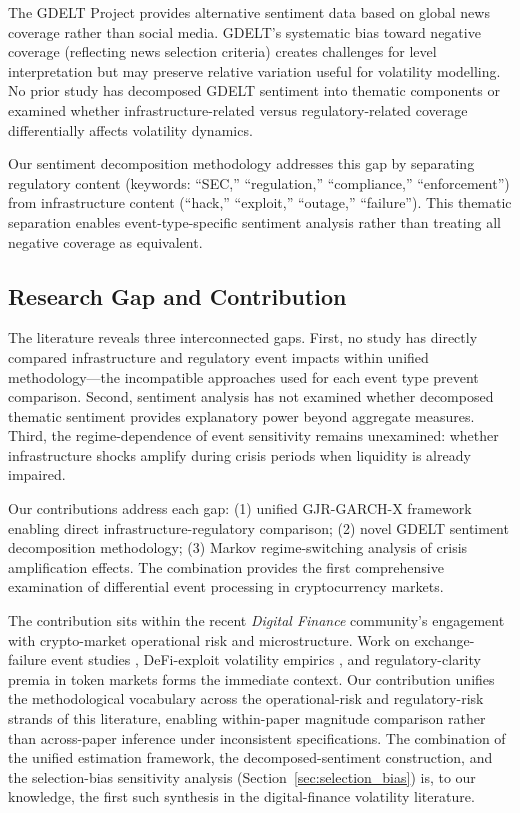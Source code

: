 \documentclass[pdflatex,sn-mathphys-num]{sn-jnl}
\theoremstyle{thmstyleone}
\theoremstyle{thmstyletwo}
\theoremstyle{thmstylethree}
\begin{document}
The GDELT Project provides alternative sentiment data based on global news coverage rather than social media. GDELT's systematic bias toward negative coverage (reflecting news selection criteria) creates challenges for level interpretation but may preserve relative variation useful for volatility modelling. No prior study has decomposed GDELT sentiment into thematic components or examined whether infrastructure-related versus regulatory-related coverage differentially affects volatility dynamics.

Our sentiment decomposition methodology addresses this gap by separating regulatory content (keywords: ``SEC,'' ``regulation,'' ``compliance,'' ``enforcement'') from infrastructure content (``hack,'' ``exploit,'' ``outage,'' ``failure''). This thematic separation enables event-type-specific sentiment analysis rather than treating all negative coverage as equivalent.

\subsection{Research Gap and Contribution}

The literature reveals three interconnected gaps. First, no study has directly compared infrastructure and regulatory event impacts within unified methodology---the incompatible approaches used for each event type prevent comparison. Second, sentiment analysis has not examined whether decomposed thematic sentiment provides explanatory power beyond aggregate measures. Third, the regime-dependence of event sensitivity remains unexamined: whether infrastructure shocks amplify during crisis periods when liquidity is already impaired.

Our contributions address each gap: (1) unified GJR-GARCH-X framework enabling direct infrastructure-regulatory comparison; (2) novel GDELT sentiment decomposition methodology; (3) Markov regime-switching analysis of crisis amplification effects. The combination provides the first comprehensive examination of differential event processing in cryptocurrency markets.

The contribution sits within the recent \textit{Digital Finance} community's engagement with crypto-market operational risk and microstructure. Work on exchange-failure event studies \citep{ChenEtAl2023}, DeFi-exploit volatility empirics \citep{Grobys2021}, and regulatory-clarity premia in token markets \citep{AuerClaessens2018, FeinsteinWerbach2021} forms the immediate context. Our contribution unifies the methodological vocabulary across the operational-risk and regulatory-risk strands of this literature, enabling within-paper magnitude comparison rather than across-paper inference under inconsistent specifications. The combination of the unified estimation framework, the decomposed-sentiment construction, and the selection-bias sensitivity analysis (Section~\ref{sec:selection_bias}) is, to our knowledge, the first such synthesis in the digital-finance volatility literature.
\end{document}
